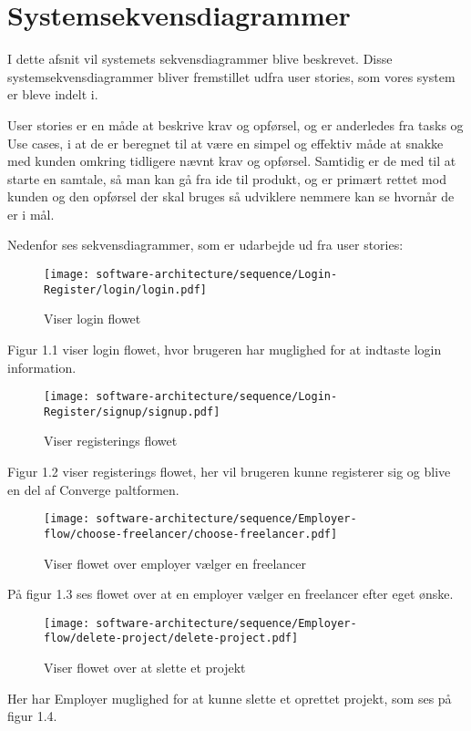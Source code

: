 \section{Systemsekvensdiagrammer}

I dette afsnit vil systemets sekvensdiagrammer blive beskrevet. Disse systemsekvensdiagrammer bliver fremstillet udfra user stories, som vores system er bleve indelt i.    



User stories er en måde at beskrive krav og opførsel, og er anderledes fra tasks og Use cases, i at de er beregnet til at være en simpel og effektiv måde at snakke med kunden omkring tidligere nævnt krav og opførsel. Samtidig er de med til at starte en samtale, så man kan gå fra ide til produkt, og er primært rettet mod kunden og den opførsel der skal bruges så udviklere nemmere kan se hvornår de er i mål.

Nedenfor ses sekvensdiagrammer, som er udarbejde ud fra user stories:

\begin{figure}[ht]
    \centering
\texttt{[image: software-architecture/sequence/Login-Register/login/login.pdf]}
\caption{Viser login flowet}
\label{fig:figure4}
\end{figure}

Figur 1.1 viser login flowet, hvor brugeren har muglighed for at indtaste login information.
\newpage
\begin{figure}[ht]
    \centering
\texttt{[image: software-architecture/sequence/Login-Register/signup/signup.pdf]}
\caption{Viser registerings flowet}
\label{fig:figure4}
\end{figure}

Figur 1.2 viser registerings flowet, her vil brugeren kunne registerer sig og blive en del af Converge paltformen.

\begin{figure}[ht]
    \centering
\texttt{[image: software-architecture/sequence/Employer-flow/choose-freelancer/choose-freelancer.pdf]}
\caption{Viser flowet over employer vælger en freelancer}
\label{fig:figure4}
\end{figure}
På figur 1.3 ses flowet over at en employer vælger en freelancer efter eget ønske.
\newpage
\begin{figure}[ht]
    \centering
\texttt{[image: software-architecture/sequence/Employer-flow/delete-project/delete-project.pdf]}
\caption{Viser flowet over at slette et projekt}
\label{fig:figure4}
\end{figure}
Her har Employer muglighed for at kunne slette et oprettet projekt, som ses på figur 1.4.

